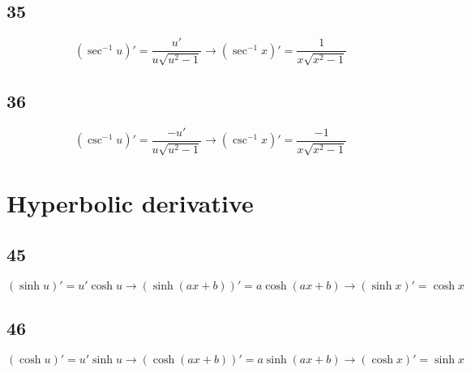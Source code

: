 \subsection{35}
\[ (\sec^{-1}u)' = \frac{u'}{u\sqrt{u^2-1}} \to (\sec^{-1}x)' = \frac{1}{x\sqrt{x^2-1}} \]

\subsection{36}
\[ (\csc^{-1}u)' = \frac{-u'}{u\sqrt{u^2-1}} \to (\csc^{-1}x)' = \frac{-1}{x\sqrt{x^2-1}} \]


\section{Hyperbolic derivative}
\subsection{45}
\[ (\sinh u)' = u'\cosh u \to (\sinh(ax+b))' = a\cosh(ax+b) \to (\sinh x)' = \cosh x \]

\subsection{46}
\[ (\cosh u)' = u'\sinh u \to (\cosh(ax+b))' = a\sinh(ax+b) \to (\cosh x)' = \sinh x \]

